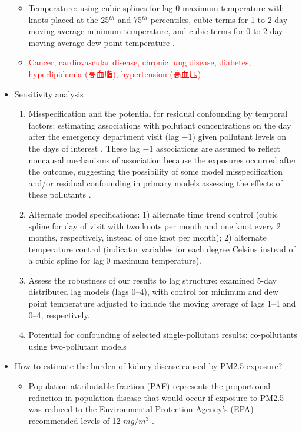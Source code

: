 \documentclass{article}
\begin{document}
\begin{itemize}
{\begin{itemize}
            \item Temperature: using cubic splines for lag 0 maximum temperature with knots placed at the 25$^{th}$ and 75$^{th}$ percentiles, cubic terms for 1 to 2 day moving-average minimum temperature, and cubic terms for 0 to 2 day moving-average dew point temperature \citep{strickland2010short}.
            \item \textcolor{red}{Cancer, cardiovascular disease, chronic lung disease, diabetes, hyperlipidemia (高血脂), hypertension (高血压)}
        \end{itemize}
    }
    \item Sensitivity analysis {
        \begin{enumerate}
            \item Misspecification and the potential for residual confounding by temporal factors: estimating associations with pollutant concentrations on the day after the emergency department visit (lag $-1$) given pollutant levels on the days of interest \citep{flanders2011method}. These lag $-1$ associations are assumed to reflect noncausal mechanisms of association because the exposures occurred after the outcome, suggesting the possibility of some model misspecification and/or residual confounding in primary models assessing the effects of these pollutants \citep{flanders2011method}.
            \item Alternate model specifications: 1) alternate time trend control (cubic spline for day of visit with two knots per month and one knot every 2 months, respectively, instead of one knot per month); 2) alternate temperature control (indicator variables for each degree Celsius instead of a cubic spline for lag 0 maximum temperature).
            \item Assess the robustness of our results to lag structure: examined 5-day distributed lag models (lags 0--4), with control for minimum and dew point temperature adjusted to include the moving average of lags 1--4 and 0--4, respectively.
            \item Potential for confounding of selected single-pollutant results: co-pollutants using two-pollutant models
        \end{enumerate}
    }
    \item How to estimate the burden of kidney disease caused by PM2.5 exposure? {
        \begin{itemize}
            \item Population attributable fraction (PAF) represents the proportional reduction in population disease that would occur if exposure to PM2.5 was reduced to the Environmental Protection Agency's (EPA) recommended levels of 12 $mg/m^3$ \citep{bowe2018particulate}.

\end{itemize}}
\end{itemize}
\end{document}
